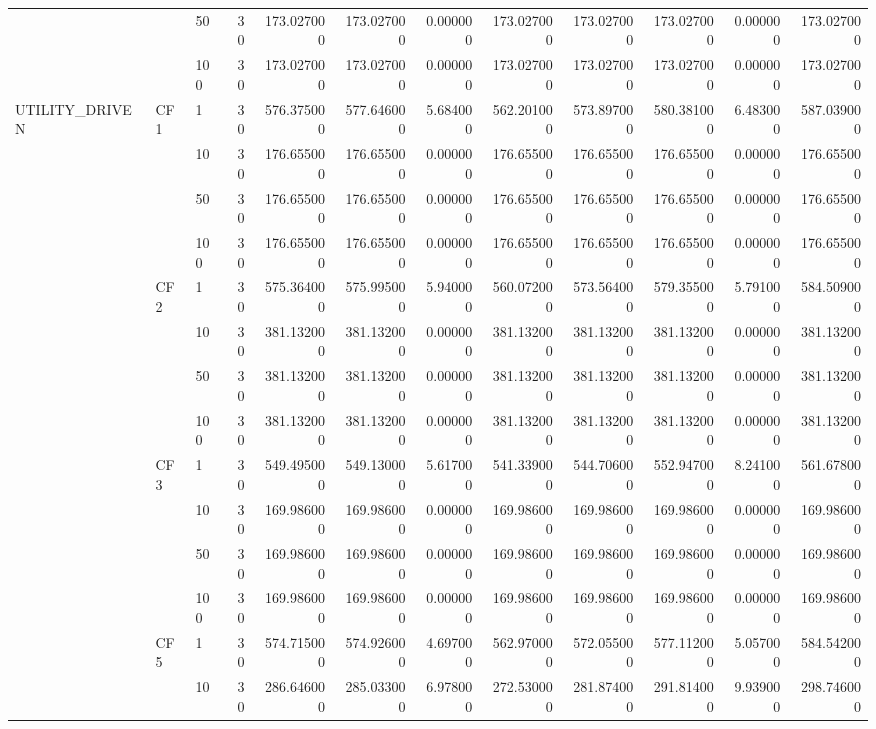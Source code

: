 \begin{tabular}{lllrrrrrrrrr}
 &  & 50 & 30 & 173.027000 & 173.027000 & 0.000000 & 173.027000 & 173.027000 & 173.027000 & 0.000000 & 173.027000 \\
 &  & 100 & 30 & 173.027000 & 173.027000 & 0.000000 & 173.027000 & 173.027000 & 173.027000 & 0.000000 & 173.027000 \\
\cline{1-12} \cline{2-12}
\multirow[t]{16}{*}{UTILITY_DRIVEN} & \multirow[t]{4}{*}{CF1} & 1 & 30 & 576.375000 & 577.646000 & 5.684000 & 562.201000 & 573.897000 & 580.381000 & 6.483000 & 587.039000 \\
 &  & 10 & 30 & 176.655000 & 176.655000 & 0.000000 & 176.655000 & 176.655000 & 176.655000 & 0.000000 & 176.655000 \\
 &  & 50 & 30 & 176.655000 & 176.655000 & 0.000000 & 176.655000 & 176.655000 & 176.655000 & 0.000000 & 176.655000 \\
 &  & 100 & 30 & 176.655000 & 176.655000 & 0.000000 & 176.655000 & 176.655000 & 176.655000 & 0.000000 & 176.655000 \\
\cline{2-12}
 & \multirow[t]{4}{*}{CF2} & 1 & 30 & 575.364000 & 575.995000 & 5.940000 & 560.072000 & 573.564000 & 579.355000 & 5.791000 & 584.509000 \\
 &  & 10 & 30 & 381.132000 & 381.132000 & 0.000000 & 381.132000 & 381.132000 & 381.132000 & 0.000000 & 381.132000 \\
 &  & 50 & 30 & 381.132000 & 381.132000 & 0.000000 & 381.132000 & 381.132000 & 381.132000 & 0.000000 & 381.132000 \\
 &  & 100 & 30 & 381.132000 & 381.132000 & 0.000000 & 381.132000 & 381.132000 & 381.132000 & 0.000000 & 381.132000 \\
\cline{2-12}
 & \multirow[t]{4}{*}{CF3} & 1 & 30 & 549.495000 & 549.130000 & 5.617000 & 541.339000 & 544.706000 & 552.947000 & 8.241000 & 561.678000 \\
 &  & 10 & 30 & 169.986000 & 169.986000 & 0.000000 & 169.986000 & 169.986000 & 169.986000 & 0.000000 & 169.986000 \\
 &  & 50 & 30 & 169.986000 & 169.986000 & 0.000000 & 169.986000 & 169.986000 & 169.986000 & 0.000000 & 169.986000 \\
 &  & 100 & 30 & 169.986000 & 169.986000 & 0.000000 & 169.986000 & 169.986000 & 169.986000 & 0.000000 & 169.986000 \\
\cline{2-12}
 & \multirow[t]{4}{*}{CF5} & 1 & 30 & 574.715000 & 574.926000 & 4.697000 & 562.970000 & 572.055000 & 577.112000 & 5.057000 & 584.542000 \\
 &  & 10 & 30 & 286.646000 & 285.033000 & 6.978000 & 272.530000 & 281.874000 & 291.814000 & 9.939000 & 298.746000 \\

\end{tabular}
